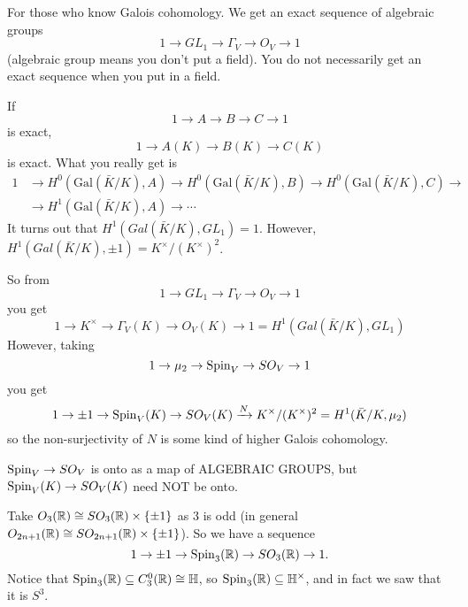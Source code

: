  \begin{remark}
   For those who know Galois cohomology. We get an exact sequence of algebraic groups
   \[
   1\to GL_1\to \Gamma_V\to O_V \to 1
   \]
   (algebraic group means you don't put a field). You do not necessarily get an exact
   sequence when you put in a field.

   If
   \[
    1\to A\to B \to C\to 1
    \]
    is exact,
   \[
    1\to A(K) \to B(K)\to C(K)
   \]
   is exact. What you really get is
   \begin{align*}
    1&\to H^0(\mathrm{Gal}(\bar K/K),A) \to H^0(\mathrm{Gal}(\bar K/K), B) \to
    H^0(\mathrm{Gal}(\bar K/K), C)\to\\
    &\to H^1(\mathrm{Gal}(\bar K/K), A)\to \cdots
   \end{align*}
   It turns out that $H^1(Gal(\bar K/K),GL_1)=1$. However, $H^1(Gal(\bar K/K),\pm
   1)=K^\times / (K^\times)^2$.

   So from
   \[
   1\to GL_1\to \Gamma_V\to O_V \to 1
   \]
   you get
   \[
    1\to K^\times \to \Gamma_V(K) \to O_V(K) \to 1= H^1(Gal(\bar K/K),GL_1)
   \]
   However, taking
   \[
    1\to \mu_2 \to \operatorname{Spin}_V \to SO_V \to 1
   \]
   you get
   \[
    1\to \pm 1\to \operatorname{Spin}_V(K) \to SO_V(K) \xrightarrow{N}
    K^\times/(K^\times)^2=H^1(\bar K/K,\mu_2)
   \]
   so the non-surjectivity of $N$ is some kind of higher Galois cohomology.
   \begin{warning}
     $\operatorname{Spin}_V \to SO_V$ is onto as a map of ALGEBRAIC GROUPS, but $\operatorname{Spin}_V(K)\to
     SO_V(K)$ need NOT be onto.
   \end{warning}
 \end{remark}

 \begin{example}
   Take $O_3(\mathbb{R})\cong SO_3(\mathbb{R})\times \{\pm 1\}$ as 3 is odd (in general
   $O_{2n+1}(\mathbb{R})\cong SO_{2n+1}(\mathbb{R})\times \{\pm 1\}$). So we have a sequence
   \[
    1\to \pm 1\to \operatorname{Spin}_3(\mathbb{R}) \to SO_3(\mathbb{R}) \to 1.
   \]
   Notice that $\operatorname{Spin}_3(\mathbb{R})\subseteq C_3^0(\mathbb{R})\cong \mathbb{H}$, so $\operatorname{Spin}_3(\mathbb{R})\subseteq
   \mathbb{H}^\times$, and in fact we saw that it is $S^3$.
 \end{example}
